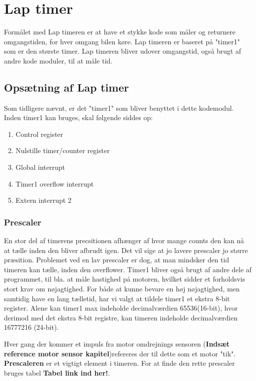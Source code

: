 \newpage
\section{Lap timer}
Formålet med Lap timeren er at have et stykke kode som måler og returnere omgangstiden, for hver omgang bilen køre. Lap timeren er baseret på "timer1" som er den største timer. Lap timeren bliver udover omgangstid, også brugt af andre kode moduler, til at måle tid.
\subsection{Opsætning af Lap timer}
Som tidligere nævnt, er det "timer1" som bliver benyttet i dette kodemodul. Inden timer1 kan bruges, skal følgende siddes op:
\begin{enumerate}
\item Control register
\item Nulstille timer/counter register
\item Global interrupt
\item Timer1 overflow interrupt
\item Extern interrupt 2 
\end{enumerate}

\subsubsection{Prescaler}
En stor del af timerens precsitionen afhænger af hvor mange counts den kan nå at tælle inden den bliver afbrudt igen. Det vil sige at jo lavere prescaler jo større præsition. Problemet ved en lav prescaler er dog, at man mindsker den tid timeren kan tælle, inden den overflower. Timer1 bliver også brugt af andre dele af programmet, til bla. at måle hastighed på motoren, hvilket sidder et forholdsvis stort krav om nøjagtighed. For både at kunne bevare en høj nøjagtighed, men samtidig have en lang tælletid, har vi valgt at tildele timer1 et ekstra 8-bit register. Alene kan timer1 max indeholde decimalværdien 65536(16-bit), hvor derimod med det ekstra 8-bit registre, kan timeren indeholde decimalværdien 16777216 (24-bit).

Hver gang der kommer et impuls fra motor omdrejnings sensoren (\textbf{Indsæt reference motor sensor kapitel})refereres der til dette som et motor "tik".
\textbf{Prescaleren} er et vigtigt element i timeren. For at finde den rette prescaler bruges tabel \textbf{Tabel link ind her!}.\\\\

